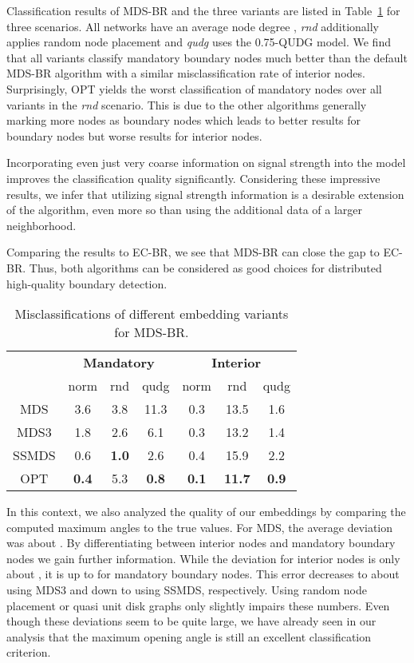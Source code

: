 \documentclass{llncs}
\begin{document}
Classification results of MDS-BR and the three variants are listed in Table~\ref{tab:mdsbr_ss} for three scenarios.
All networks have an average node degree , \emph{rnd} additionally applies random node placement and \emph{qudg} uses the 0.75-QUDG model.
We find that all variants classify mandatory boundary nodes much better than the default MDS-BR algorithm with a similar misclassification rate of interior nodes.
Surprisingly, OPT yields the worst classification of mandatory nodes over all variants in the \emph{rnd} scenario.
This is due to the other algorithms generally marking more nodes as boundary nodes which leads to better results for boundary nodes but worse results for interior nodes.

Incorporating even just very coarse information on signal strength into the model improves the classification quality significantly.
Considering these impressive results, we infer that utilizing signal strength information is a desirable extension of the algorithm, even more so than using the additional data of a larger neighborhood.

Comparing the results to EC-BR, we see that MDS-BR can close the gap to EC-BR.
Thus, both algorithms can be considered as good choices for distributed high-quality boundary detection.

\begin{table}[b]
\setlength\tabcolsep{5pt}
\centering
\caption{Misclassifications of different embedding variants for MDS-BR.}\label{tab:mdsbr_ss}
\begin{tabular}{c||ccc||ccc}
& \multicolumn{3}{c||}{\bfseries Mandatory}& \multicolumn{3}{c}{\bfseries Interior} \\
 & norm & rnd & qudg & norm & rnd & qudg \\
\hline
MDS & 3.6 & 3.8 & 11.3 & 0.3 & 13.5 & 1.6  \\
MDS3 & 1.8 & 2.6 & 6.1 & 0.3 & 13.2 & 1.4  \\
SSMDS & 0.6 & \bfseries 1.0 & 2.6 & 0.4 & 15.9 & 2.2  \\
OPT & \bfseries 0.4 & 5.3 & \bfseries 0.8 & \bfseries 0.1 & \bfseries 11.7 & \bfseries 0.9
\end{tabular}
\end{table}

In this context, we also analyzed the quality of our embeddings by comparing the computed maximum angles to the true values.
For MDS, the average deviation was about .
By differentiating between interior nodes and mandatory boundary nodes we gain further information.
While the deviation for interior nodes is only about , it is up to  for mandatory boundary nodes.
This error decreases to about  using MDS3 and down to  using SSMDS, respectively.
Using random node placement or quasi unit disk graphs only slightly impairs these numbers.
Even though these deviations seem to be quite large, we have already seen in our analysis that the maximum opening angle is still an excellent classification criterion.
\end{document}
